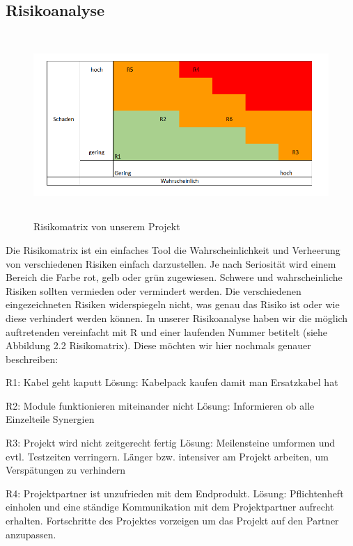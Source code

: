 \newpage
\def \currentAuthor{Kevin Glatz}
\subsection{Risikoanalyse}


\begin{figure}
	\centering
	\includegraphics[height=7cm,angle=90]{figures/risiko}
	\caption{Risikomatrix von unserem Projekt}
\end{figure}

Die Risikomatrix ist ein einfaches Tool die Wahrscheinlichkeit und Verheerung von verschiedenen Risiken einfach darzustellen. Je nach Seriosität wird einem Bereich die Farbe rot, gelb oder grün zugewiesen. Schwere und wahrscheinliche Risiken sollten vermieden oder vermindert werden.  Die verschiedenen eingezeichneten Risiken widerspiegeln nicht, was genau das Risiko ist oder wie diese verhindert werden können. In unserer Risikoanalyse haben wir die möglich auftretenden vereinfacht mit R und einer laufenden Nummer betitelt (siehe Abbildung 2.2 Risikomatrix). Diese möchten wir hier nochmals genauer beschreiben:

	R1: Kabel geht kaputt \newline
	Lösung: Kabelpack kaufen damit man Ersatzkabel hat

	R2: Module funktionieren miteinander nicht \newline
	Lösung: Informieren ob alle Einzelteile Synergien 
	
	R3: Projekt wird nicht zeitgerecht fertig\newline
	Lösung:  Meilensteine umformen und evtl. Testzeiten verringern. Länger bzw. intensiver am Projekt arbeiten, um Verspätungen zu verhindern 
	
	R4: Projektpartner ist unzufrieden mit dem Endprodukt. \newline
	Lösung:  Pflichtenheft einholen und eine ständige Kommunikation mit dem Projektpartner aufrecht erhalten. Fortschritte des Projektes vorzeigen um das Projekt auf den Partner anzupassen.
	
